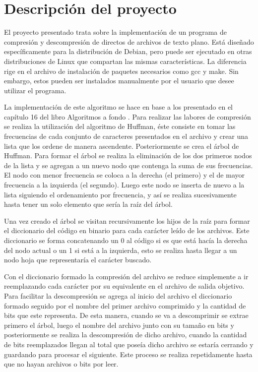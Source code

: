 \documentclass{report}
\begin{document}
\section{Descripción del proyecto}
El proyecto presentado trata sobre la implementación de un programa de compresión y descompresión de directos de archivos de texto plano. Está diseñado específicamente para la distribución de Debian, pero puede ser ejecutado en otras distribuciones de Linux que compartan las mismas características. La diferencia rige en el archivo de instalación de paquetes necesarios como gcc y make. Sin embargo, estos pueden ser instalados manualmente por el usuario que desee utilizar el programa.

La implementación de este algoritmo se hace en base a los presentado en el capítulo 16 del libro Algoritmos a fondo \cite{book_huffman}. Para realizar las labores de compresión se realiza la utilización del algoritmo de Huffman, éste consiste en tomar las frecuencias de cada conjunto de caracteres presentados en el archivo y crear una lista que los ordene de manera ascendente. Posteriormente se crea el árbol de Huffman. Para formar el árbol se realiza la eliminación de los dos primeros nodos de la lista y se agregan a un nuevo nodo que contenga la suma de sus frecuencias. El nodo con menor frecuencia se coloca a la derecha (el primero) y el de mayor frecuencia a la izquierda (el segundo). Luego este nodo se inserta de nuevo a la lista siguiendo el ordenamiento por frecuencia, y así se realiza sucesivamente hasta tener un solo elemento que sería la raíz del árbol.

Una vez creado el árbol se visitan recursivamente los hijos de la raíz para formar el diccionario del código en binario para cada carácter leído de los archivos. Este diccionario se forma concatenando un 0 al código si es que está hacía la derecha del nodo actual o un 1 si está a la izquierda, esto se realiza hasta llegar a un nodo hoja que representaría el carácter buscado.

Con el diccionario formado la compresión del archivo se reduce simplemente a ir reemplazando cada carácter por su equivalente en el archivo de salida objetivo. Para facilitar la descompresión se agrega al inicio del archivo el diccionario formado seguido por el nombre del primer archivo comprimido y la cantidad de bits que este representa. De esta manera, cuando se va a descomprimir se extrae primero el árbol, luego el nombre del archivo junto con su tamaño en bits y posteriormente se realiza la descompresión de dicho archivo, cuando la cantidad de bits reemplazados llegan al total que poseía dicho archivo se estaría cerrando y guardando para procesar el siguiente. Este proceso se realiza repetidamente hasta que no hayan archivos o bits por leer.
\end{document}
